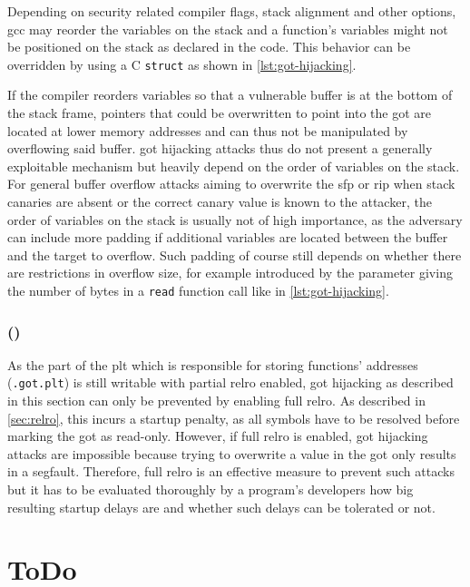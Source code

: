 Depending on security related compiler flags, stack alignment and other options, \gls{gcc} may reorder the variables on the stack and a function's variables might not be positioned on the stack as declared in the code.
This behavior can be overridden by using a C \texttt{struct} as shown in \cref{lst:got-hijacking}.

If the compiler reorders variables so that a vulnerable buffer is at the bottom of the stack frame, pointers that could be overwritten to point into the \gls{got} are located at lower memory addresses and can thus not be manipulated by overflowing said buffer.
\gls{got} hijacking attacks thus do not present a generally exploitable mechanism but heavily depend on the order of variables on the stack.
For general buffer overflow attacks aiming to overwrite the \gls{sfp} or \gls{rip} when stack canaries are absent or the correct canary value is known to the attacker, the order of variables on the stack is usually not of high importance, as the adversary can include more padding if additional variables are located between the buffer and the target to overflow.
Such padding of course still depends on whether there are restrictions in overflow size, for example introduced by the parameter giving the number of bytes in a \texttt{read} function call like in \cref{lst:got-hijacking}.

\subsubsection{ ()}
\label{subsubsec:got-relro}

As the part of the \gls{plt} which is responsible for storing functions' addresses (\texttt{.got.plt}) is still writable with partial \gls{relro} enabled, \gls{got} hijacking as described in this section can only be prevented by enabling full \gls{relro}.
As described in \cref{sec:relro}, this incurs a startup penalty, as all symbols have to be resolved before marking the \gls{got} as read-only.
However, if full \gls{relro} is enabled, \gls{got} hijacking attacks are impossible because trying to overwrite a value in the \gls{got} only results in a \gls{segfault}.
Therefore, full \gls{relro} is an effective measure to prevent such attacks but it has to be evaluated thoroughly by a program's developers how big resulting startup delays are and whether such delays can be tolerated or not.


\section*{ToDo}

